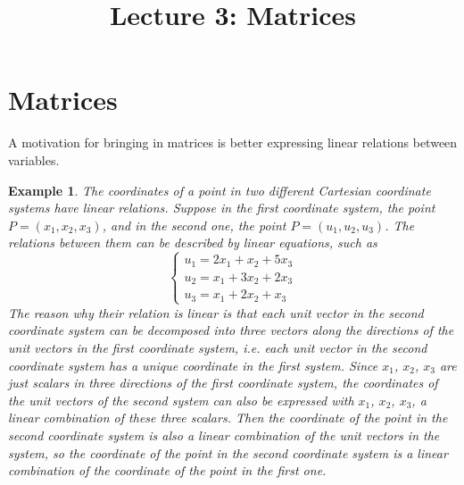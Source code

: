 \documentclass{article}
\title{Lecture 3: Matrices}
\author{}
\date{}
\newtheorem{example}{Example}
\begin{document}
    
\maketitle

\section{Matrices}

A motivation for bringing in matrices is better expressing linear relations
between variables.

\begin{example}
  The coordinates of a point in two different Cartesian coordinate systems have
  linear relations. Suppose in the first coordinate system, the point
  $P = (x_1, x_2, x_3)$, and in the second one, the point $P = (u_1, u_2, u_3)$.
  The relations between them can be described by linear equations, such as
  \[
    \left\{ \begin{array}{ll}
    u_1 = 2x_1 + x_2 + 5x_3 \\
    u_2 = x_1 + 3x_2 + 2x_3 \\
    u_3 = x_1 + 2x_2 + x_3
    \end{array} \right.
  \]
  The reason why their relation is linear is that each unit vector in the
  second coordinate system can be decomposed into three vectors along the
  directions of the unit vectors in the first coordinate system, i.e. each unit
  vector in the second coordinate system has a unique coordinate in the first
  system. Since $x_1$, $x_2$, $x_3$ are just scalars in three directions of the
  first coordinate system, the coordinates of the unit vectors of the second
  system can also be expressed with $x_1$, $x_2$, $x_3$, a linear combination
  of these three scalars. Then the coordinate of the point in the second
  coordinate system is also a linear combination of the unit vectors in the
  system, so the coordinate of the point in the second coordinate system is a
  linear combination of the coordinate of the point in the first one.


\end{example}
\end{document}
